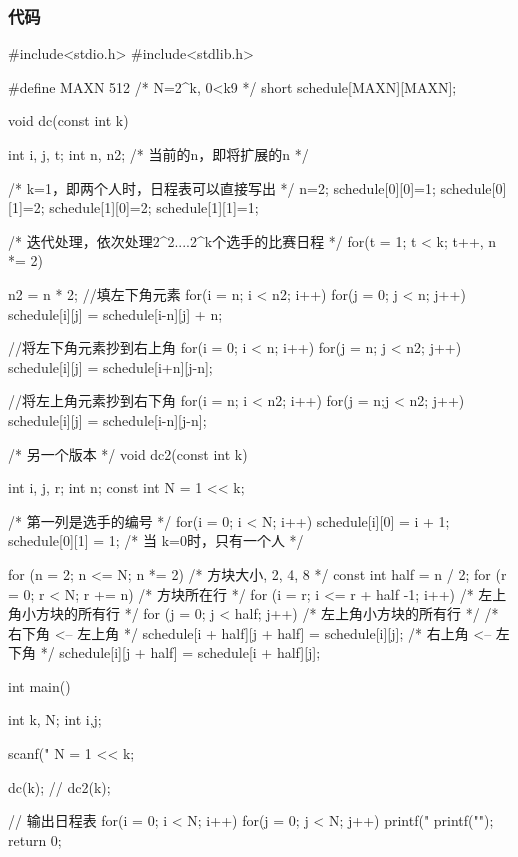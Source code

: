 \subsubsection{代码}
\begin{Codex}[label=roundrobin_scheduling.c]
#include<stdio.h>
#include<stdlib.h>

#define MAXN 512   /* N=2^k, 0<k9 */
short schedule[MAXN][MAXN];

void dc(const int k) {
    int i, j, t;
    int n, n2; /* 当前的n，即将扩展的n */

    /* k=1，即两个人时，日程表可以直接写出 */
    n=2;
    schedule[0][0]=1; schedule[0][1]=2;
    schedule[1][0]=2; schedule[1][1]=1;

     /* 迭代处理，依次处理2^2....2^k个选手的比赛日程 */
    for(t = 1; t < k; t++, n *= 2) {
        n2 = n * 2;
        //填左下角元素
        for(i = n; i < n2; i++)
            for(j = 0; j < n; j++)
                schedule[i][j] = schedule[i-n][j] + n;

        //将左下角元素抄到右上角
        for(i = 0; i < n; i++)
            for(j = n; j < n2; j++)
                schedule[i][j] = schedule[i+n][j-n];

        //将左上角元素抄到右下角
        for(i = n; i < n2; i++)
            for(j = n;j < n2; j++)
                schedule[i][j] = schedule[i-n][j-n];
    }
}

/* 另一个版本 */
void dc2(const int k) {
    int i, j, r;
    int n;
    const int N = 1 << k;

    /* 第一列是选手的编号 */
    for(i = 0; i < N; i++) schedule[i][0] = i + 1;
    schedule[0][1] = 1;  /* 当 k=0时，只有一个人 */

    for (n = 2; n <= N; n *= 2) {  /* 方块大小, 2, 4, 8 */
        const int half = n / 2;
        for (r = 0; r < N; r += n) { /* 方块所在行 */
            for (i = r; i <= r + half -1; i++) {  /* 左上角小方块的所有行 */
                for (j = 0; j < half; j++) {  /* 左上角小方块的所有行 */
                    /* 右下角 <-- 左上角 */
                    schedule[i + half][j + half] = schedule[i][j];
                    /* 右上角 <-- 左下角 */
                    schedule[i][j + half] = schedule[i + half][j];
                }
            }
        }
    }
}


int main(){
    int k, N;
    int i,j;

    scanf("%
    N = 1 << k;

    dc(k);
    // dc2(k);

    // 输出日程表
    for(i = 0; i < N; i++) {
        for(j = 0; j < N; j++) printf("%
        printf("\n");
    }
    return 0;
}
\end{Codex}

